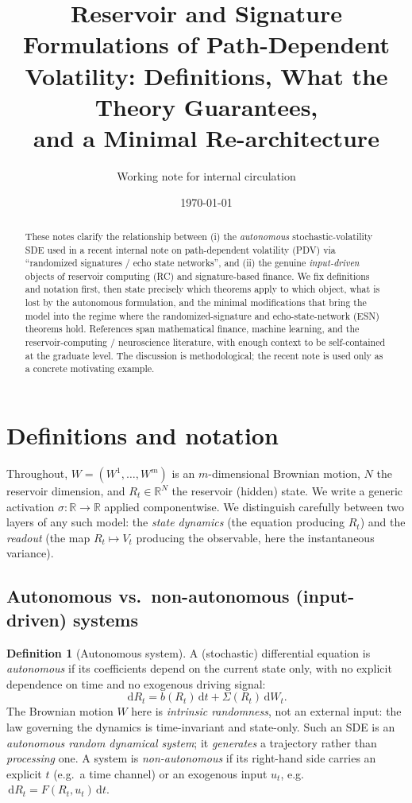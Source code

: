 \documentclass[11pt]{article}
\title{\textbf{Reservoir and Signature Formulations of Path-Dependent\\ Volatility: Definitions, What the Theory Guarantees,\\ and a Minimal Re-architecture}}
\author{Working note for internal circulation}
\date{\today}
\theoremstyle{definition}
\newtheorem{definition}{Definition}[section]
\theoremstyle{plain}
\newcommand{\R}{\mathbb{R}}
\newcommand{\dd}{\,\mathrm{d}}
\begin{document}
\maketitle

\begin{abstract}
\noindent These notes clarify the relationship between (i) the \emph{autonomous} stochastic-volatility SDE used in a recent internal note on path-dependent volatility (PDV) via ``randomized signatures / echo state networks'', and (ii) the genuine \emph{input-driven} objects of reservoir computing (RC) and signature-based finance. We fix definitions and notation first, then state precisely which theorems apply to which object, what is lost by the autonomous formulation, and the minimal modifications that bring the model into the regime where the randomized-signature and echo-state-network (ESN) theorems hold. References span mathematical finance, machine learning, and the reservoir-computing / neuroscience literature, with enough context to be self-contained at the graduate level. The discussion is methodological; the recent note is used only as a concrete motivating example.
\end{abstract}

\tableofcontents

\section{Definitions and notation}
\label{sec:defs}

Throughout, $W=(W^1,\dots,W^m)$ is an $m$-dimensional Brownian motion, $N$ the reservoir dimension, and $R_t\in\R^N$ the reservoir (hidden) state. We write a generic activation $\sigma:\R\to\R$ applied componentwise. We distinguish carefully between two layers of any such model: the \emph{state dynamics} (the equation producing $R_t$) and the \emph{readout} (the map $R_t\mapsto V_t$ producing the observable, here the instantaneous variance).

\subsection{Autonomous vs.\ non-autonomous (input-driven) systems}

\begin{definition}[Autonomous system]
\label{def:autonomous}
A (stochastic) differential equation is \emph{autonomous} if its coefficients depend on the current state only, with no explicit dependence on time and no exogenous driving signal:
\[
\dd R_t = b(R_t)\dd t + \Sigma(R_t)\dd W_t .
\]
The Brownian motion $W$ here is \emph{intrinsic randomness}, not an external input: the law governing the dynamics is time-invariant and state-only. Such an SDE is an \emph{autonomous random dynamical system}; it \emph{generates} a trajectory rather than \emph{processing} one. A system is \emph{non-autonomous} if its right-hand side carries an explicit $t$ (e.g.\ a time channel) or an exogenous input $u_t$, e.g.\ $\dd R_t = F(R_t,u_t)\dd t$.
\end{definition}
\end{document}
